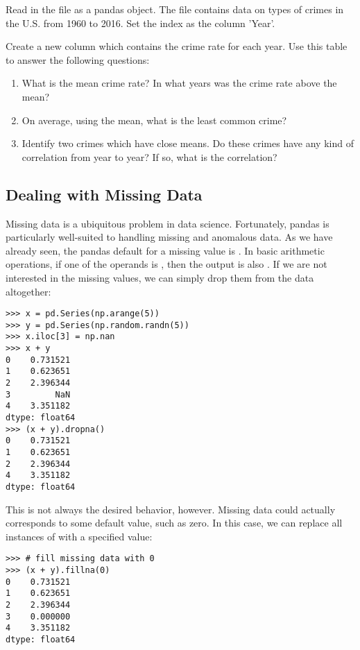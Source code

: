 \begin{problem}
Read in the file  as a pandas object.
The file contains data on types of crimes in the U.S. from 1960 to 2016.
Set the index as the column 'Year'.

Create a new column  which contains the crime rate for each year.
Use this table to answer the following questions:
\begin{enumerate}
    \item What is the mean crime rate? In what years was the crime rate above the mean?
    \item On average, using the mean, what is the least common crime?
    \item Identify two crimes which have close means. Do these crimes have any kind of correlation from year to year? If so, what is the correlation?
       
\end{enumerate}
\end{problem}

\subsection*{Dealing with Missing Data}

Missing data is a ubiquitous problem in data science.
Fortunately, pandas is particularly well-suited to
handling missing and anomalous data.
As we have already seen, the pandas default for a missing value is .
In basic arithmetic operations, if one of the operands is , then the output is also .
If we are not interested in the missing values, we can simply drop them from the data altogether:

\begin{lstlisting}
>>> x = pd.Series(np.arange(5))
>>> y = pd.Series(np.random.randn(5))
>>> x.iloc[3] = np.nan
>>> x + y
0    0.731521
1    0.623651
2    2.396344
3         NaN
4    3.351182
dtype: float64
>>> (x + y).dropna()
0    0.731521
1    0.623651
2    2.396344
4    3.351182
dtype: float64
\end{lstlisting}

This is not always the desired behavior, however.
Missing data could actually corresponds to some default value, such as zero.
In this case, we can replace all instances of  with a specified value:
\begin{lstlisting}
>>> # fill missing data with 0
>>> (x + y).fillna(0)
0    0.731521
1    0.623651
2    2.396344
3    0.000000
4    3.351182
dtype: float64
\end{lstlisting}

